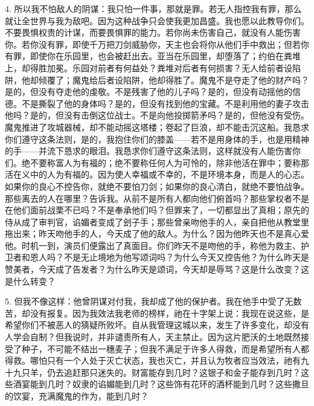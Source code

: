 4. 所以我不怕敌人的阴谋：我只怕一件事，那就是罪。若无人指控我有罪，那么就让全世界与我为敌吧。因为这种战争只会使我更加昌盛。我也愿以此教导你们。不要畏惧权贵的计谋，而要畏惧罪的能力。若你尚未伤害自己，就没有人能伤害你。若你没有罪，即使千万把刀剑威胁你，天主也会将你从他们手中救出；但若你有罪，即使你在乐园里，也会被赶出去。亚当在乐园里，却堕落了；约伯在粪堆上，却得胜加冕。乐园对前者有何益处？粪堆对后者有何损害？无人给前者设陷阱，他却倾覆了；魔鬼给后者设陷阱，他却得胜了。魔鬼不是夺走了他的财产吗？是的，但没有夺走他的虔敬。不是残害了他的儿子吗？是的，但没有动摇他的信德。不是撕裂了他的身体吗？是的，但没有找到他的宝藏。不是利用他的妻子攻击他吗？是的，但没有击倒这位战士。不是向他投掷箭矛吗？是的，但他没有受伤。魔鬼推进了攻城器械，却不能动摇这塔楼；卷起了巨浪，却不能击沉这船。我恳求你们遵守这条法则，是的，我抱住你们的膝盖——若不是用身体的手，也是用精神的手——并流下恳求的眼泪。我恳求你们遵守这条法则，这样就没有人能伤害你们。绝不要称富人为有福的；绝不要称任何人为可怜的，除非他活在罪中；要称那活在义中的人为有福的。因为使人幸福或不幸的，不是环境本身，而是人的心志。如果你的良心不控告你，就绝不要怕刀剑；如果你的良心清白，就绝不要怕战争。那些离去的人在哪里？告诉我。从前不是所有人都向他们俯首吗？那些掌权者不是在他们面前战栗不已吗？不是奉承他们吗？但罪来了，一切都显出了真相；原先的侍从成了审判官，谄媚者变成了刽子手；那些曾亲吻他手的人，亲自把他从教堂里拖出来；昨天吻他手的人，今天成了他的敌人。为什么？因为他昨天也不是真心爱他。时机一到，演员们便露出了真面目。你们昨天不是吻他的手，称他为救主、护卫者和恩人吗？不是无止境地为他写颂词吗？为什么今天又控告他？为什么昨天是赞美者，今天成了告发者？为什么昨天是颂词，今天却是辱骂？这是什么改变？这是什么转变？\par

5. 但我不像这样：他曾阴谋对付我，我却成了他的保护者。我在他手中受了无数苦，却没有报复。因为我效法我老师的榜样，祂在十字架上说：我现在说这些，是希望你们不被恶人的猜疑所败坏。自从我管理这城以来，发生了许多变化，却没有人学会自制？但我说时，并非谴责所有人，天主禁止。因为这片肥沃的土地既然接受了种子，不可能不结出一穗麦子；但我不满足于许多人得救，而是希望所有人都得救。哪怕只有一个人处于灭亡状态，我也灭亡，并且认为牧者应当效法，祂有九十九只羊，仍去追赶那只迷失的。财富能存到几时？这银子和金子能存到几时？这些酒宴能到几时？奴隶的谄媚能到几时？这些饰有花环的酒杯能到几时？这些撒旦的饮宴，充满魔鬼的作为，能到几时？\par

